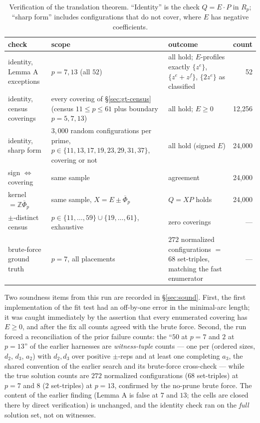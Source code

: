 \documentclass[11pt,a4paper]{article}
\numberwithin{equation}{section}
\theoremstyle{plain}
\theoremstyle{definition}
\theoremstyle{remark}
\newcommand{\Z}{\mathbb{Z}}
\begin{document}
\begin{table}[t]
\centering
\small
\caption{Verification of the translation theorem. ``Identity'' is the check
$Q=E\cdot P$ in $R_p$; ``sharp form'' includes configurations that do not
cover, where $E$ has negative coefficients.}
\label{tab:gtverify}
\begin{tabularx}{\textwidth}{@{}lXXr@{}}
\toprule
check & scope & outcome & count \\
\midrule
identity, Lemma A exceptions & $p=7,13$ (all $52$) & all hold; $E$-profiles
exactly $\{z^e\}$, $\{z^e{+}z^f\}$, $\{2z^e\}$ as classified & 52 \\
identity, census coverings & every covering of \S\ref{sec:gt-census}
(census $11\le p\le 61$ plus boundary $p=5,7,13$) & all hold; $E\ge 0$ & 12{,}256 \\
identity, sharp form & $3{,}000$ random configurations per prime, $p\in\{11,
13,17,19,23,29,31,37\}$, covering or not & all hold (signed $E$) & 24{,}000 \\
sign $\Leftrightarrow$ covering & same sample & agreement & 24{,}000 \\
kernel $=\Z\overline\Phi_p$ & same sample, $X=E\pm\overline\Phi_p$ &
$Q=XP$ holds & 24{,}000 \\
$\pm$-distinct census & $p\in\{11,\dots,59\}\cup\{19,\dots,61\}$, exhaustive
& zero coverings & --- \\
brute-force ground truth & $p=7$, all placements & $272$ normalized
configurations $=$ $68$ set-triples, matching the fast enumerator & --- \\
\bottomrule
\end{tabularx}
\end{table}

Two soundness items from this run are recorded in \S\ref{sec:sound}. First,
the first implementation of the fit test had an off-by-one error in the
minimal-arc length; it was caught immediately by the assertion that every
enumerated covering has $E\ge 0$, and after the fix all counts agreed with
the brute force. Second, the run forced a reconciliation of the prior
failure counts: the ``$50$ at $p=7$ and $2$ at $p=13$'' of the earlier
harnesses are \emph{witness-tuple} counts --- one per (ordered sizes,
$d_2$, $d_3$, $a_2$) with $d_2,d_3$ over positive $\pm$-reps and at least
one completing $a_3$, the shared convention of the earlier search and its
brute-force cross-check --- while the true solution counts are $272$
normalized configurations ($68$ set-triples) at $p=7$ and $8$
($2$ set-triples) at $p=13$, confirmed by the no-prune brute force. The
content of the earlier finding (Lemma A is false at $7$ and $13$; the cells
are closed there by direct verification) is unchanged, and the identity
check ran on the \emph{full} solution set, not on witnesses.
\end{document}
